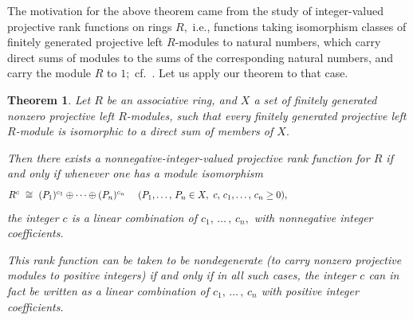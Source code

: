 \documentclass{amsart}
\newtheorem{theorem}{Theorem}
\numberwithin{equation}{section}
\numberwithin{theorem}{section}
\newcommand{\2}{\mathbf{2}}
\begin{document}
The motivation for the above theorem came
from the study of integer-valued
projective rank functions on rings $R,$ i.e.,
functions taking isomorphism classes of finitely
generated projective left $\!R\!$-modules to natural numbers,
which carry direct sums of modules to the sums of the
corresponding natural numbers,
and carry the module $R$ to $1;$ cf.~\cite{DS}.
Let us apply our theorem to that case.

\begin{theorem}\label{T.proj}
Let $R$ be an associative ring, and $X$ a set of
finitely generated nonzero projective left $\!R\!$-modules,
such that every finitely generated projective left $\!R\!$-module is
isomorphic to a direct sum of members of $X.$

Then there exists a nonnegative-integer-valued
projective rank function for $R$
if and only if whenever one has a module isomorphism
%
\begin{equation}\begin{minipage}[c]{35pc}\label{d.proj}
$R^c\ \cong \ (P_1)^{c_1} \oplus \dots \oplus (P_n)^{c_n}
\ \ \ \ (P_1,\dots,\,P_n\in X,~c,\,c_1,\dots,\,c_n\geq 0),$
\end{minipage}\end{equation}
%
the integer $c$ is a linear combination
of $c_1,\,\dots\,,\,c_n,$ with nonnegative integer coefficients.

This rank function can be taken to be {\em nondegenerate}
{\rm(}to carry nonzero projective modules to positive
integers{\rm)} if and only if in all such cases,
the integer $c$ can in fact be written as a linear combination
of $c_1,\,\dots\,,\,c_n$ with {\em positive} integer coefficients.
\end{theorem}
\end{document}
